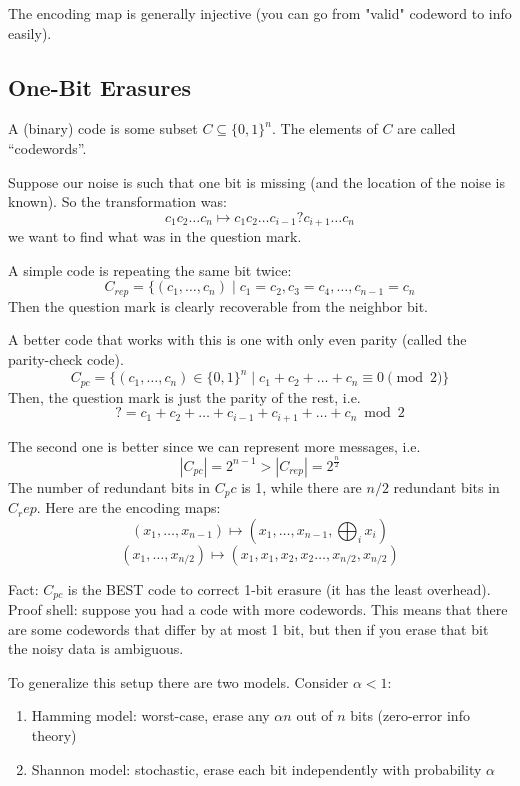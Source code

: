 The encoding map is generally injective (you can go from "valid" codeword to info easily).

\subsection{One-Bit Erasures}

\begin{definition}
    A (binary) code is some subset $C \subseteq \{0, 1\}^n$. The elements of $C$ are called ``codewords''.
\end{definition}

Suppose our noise is such that one bit is missing (and the location of the noise is known). So the transformation was:
\[ c_1 c_2 \dots c_n \mapsto c_1 c_2 \dots c_{i - 1} ? c_{i + 1} \dots c_n \]
we want to find what was in the question mark. 

A simple code is repeating the same bit twice:
\[ C_{rep} = \{(c_1, \dots, c_n) \mid c_1 = c_2, c_3 = c_4, \dots, c_{n - 1} = c_n \]
Then the question mark is clearly recoverable from the neighbor bit.

A better code that works with this is one with only even parity (called the parity-check code).
\[ C_{pc} = \{(c_1, \dots, c_n) \in \{0, 1\}^n \mid c_1 + c_2 + \dots + c_n \equiv 0 \pmod 2 \} \]
Then, the question mark is just the parity of the rest, i.e.
\[ ? = c_1 + c_2 + \dots + c_{i - 1} + c_{i + 1} + \dots + c_n \bmod 2 \]

The second one is better since we can represent more messages, i.e.
\[ |C_{pc}| = 2^{n - 1} > |C_{rep}| = 2^{\frac{n}{2}} \]
The number of redundant bits in $C_pc$ is 1, while there are $n/2$ redundant bits in $C_rep$.
Here are the encoding maps:
\[ (x_1, \dots, x_{n - 1}) \mapsto (x_1, \dots, x_{n - 1}, \bigoplus_{i} x_i) \]
\[ (x_1, \dots, x_{n/2}) \mapsto (x_1, x_1, x_2, x_2 \dots, x_{n/2}, x_{n/2}) \]

Fact: $C_{pc}$ is the BEST code to correct 1-bit erasure (it has the least overhead). Proof shell:
suppose you had a code with more codewords. This means that there are some codewords that differ by at most 1 bit, but then
if you erase that bit the noisy data is ambiguous. 

To generalize this setup there are two models. Consider $\alpha < 1$:

\begin{enumerate}
    \item Hamming model: worst-case, erase any $\alpha n$ out of $n$ bits (zero-error info theory)
    \item Shannon model: stochastic, erase each bit independently with probability $\alpha$
\end{enumerate}


